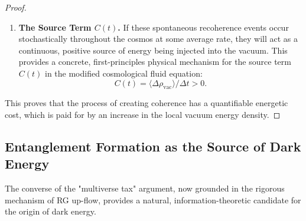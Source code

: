 \documentclass[11pt, letterpaper]{report}
\theoremstyle{plain} %
\theoremstyle{definition} %
\theoremstyle{remark} %
\begin{document}
\begin{proof}
\begin{enumerate}
    \item \textbf{The Source Term $C(t)$.} If these spontaneous recoherence events occur stochastically throughout the cosmos at some average rate, they will act as a continuous, positive source of energy being injected into the vacuum. This provides a concrete, first-principles physical mechanism for the source term $C(t)$ in the modified cosmological fluid equation:
    \begin{equation}
        C(t) = \langle \Delta \rho_{\text{vac}} \rangle / \Delta t > 0.
    \end{equation}
\end{enumerate}
This proves that the process of creating coherence has a quantifiable energetic cost, which is paid for by an increase in the local vacuum energy density.
\end{proof}

\subsection{Entanglement Formation as the Source of Dark Energy}
\label{subsec:explore_dark_energy_revised}

The converse of the "multiverse tax" argument, now grounded in the rigorous mechanism of RG up-flow, provides a natural, information-theoretic candidate for the origin of dark energy.
\end{document}
